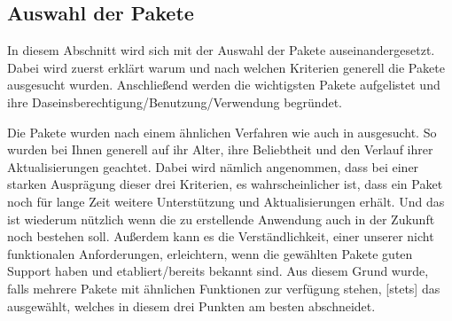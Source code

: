 \subsection{Auswahl der Pakete}\myCheckmark
In diesem Abschnitt wird sich mit der Auswahl der Pakete auseinandergesetzt. Dabei wird zuerst erklärt warum und nach welchen Kriterien generell die Pakete ausgesucht wurden. Anschließend werden die wichtigsten Pakete aufgelistet und ihre Daseinsberechtigung/Benutzung/Verwendung begründet.

\myNewSection
	Die Pakete wurden nach einem ähnlichen Verfahren wie auch in  ausgesucht. So wurden bei Ihnen generell auf ihr Alter, ihre Beliebtheit und den Verlauf ihrer Aktualisierungen geachtet. 
	Dabei wird nämlich angenommen, dass bei einer starken Ausprägung dieser drei Kriterien, es wahrscheinlicher ist, dass ein Paket noch für lange Zeit weitere Unterstützung und Aktualisierungen erhält. Und das ist wiederum nützlich wenn die zu erstellende Anwendung auch in der Zukunft noch bestehen soll. 
	Außerdem kann es die Verständlichkeit, einer unserer nicht funktionalen Anforderungen, erleichtern, wenn die gewählten Pakete guten Support haben und etabliert/bereits bekannt sind. 
	Aus diesem Grund wurde, falls mehrere Pakete mit ähnlichen Funktionen zur verfügung stehen, [stets] das ausgewählt, welches in diesem drei Punkten am besten abschneidet.

